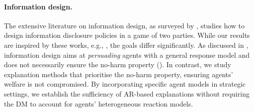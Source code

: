 \paragraph{Information design.} The extensive literature on information design, as surveyed by \citet{bergemann2019information}, studies how to design information disclosure policies in a game of two parties. While our results are inspired by these works, e.g., , the goals differ significantly. As discussed in , information design aims at \textit{persuading} agents with a general response model and does not necessarily ensure the no-harm property (). In contrast, we study explanation methods that prioritise the no-harm property, ensuring agents' welfare is not compromised.
By incorporating specific agent models in strategic settings, we establish the sufficiency of AR-based explanations without requiring the DM to account for agents' heterogeneous reaction models.

